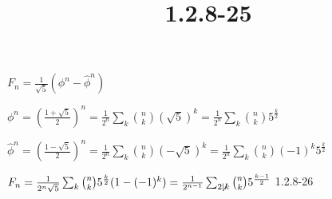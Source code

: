 \documentclass{article}
\title{1.2.8-25}
\begin{document}
\maketitle

\( F_n = \frac{1}{\sqrt{5}}(\phi^n - \hat{\phi}^n) \)

\( \phi^n = (\frac{1+\sqrt{5}}{2})^n = \frac{1}{2^n} \sum_{k} \binom{n}{k}(\sqrt{5})^k = \frac{1}{2^n} \sum_{k} \binom{n}{k} 5^{\frac{k}{2}} \)

\( \hat{\phi}^n = (\frac{1-\sqrt{5}}{2})^n = \frac{1}{2^n} \sum_{k} \binom{n}{k}(-\sqrt{5})^k = \frac{1}{2^n} \sum_{k} \binom{n}{k} (-1)^k5^{\frac{k}{2}} \)

\( F_n = \frac{1}{2^n\sqrt{5}}\sum_{k} \binom{n}{k}5^{\frac{k}{2}}(1-(-1)^k) = \frac{1}{2^{n-1}} \sum_{2 \not\mid k} \binom{n}{k}5^{\frac{k-1}{2}} \)
1.2.8-26
\end{document}
